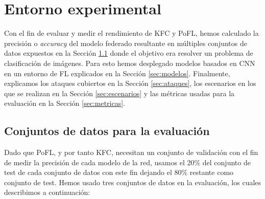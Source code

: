 \chapter{Entorno experimental}\label{sec:experimentos}

Con el fin de evaluar y medir el rendimiento de \ac{KFC} y \ac{PoFL}, hemos calculado la precisión o \textit{accuracy} del modelo federado resultante en múltiples conjuntos de datos expuestos en la Sección \ref{sec:evaldatasets} donde el objetivo era resolver un problema de clasificación de imágenes. Para esto hemos desplegado modelos basados en \ac{CNN} en un entorno de \ac{FL} explicados en la Sección \ref{sec:modelos}. Finalmente, explicamos los ataques cubiertos en la Sección \ref{sec:ataques}, los escenarios en los que se realizan en la Sección \ref{sec:escenarios} y las métricas usadas para la evaluación en la Sección \ref{sec:metricas}.

\section{Conjuntos de datos para la evaluación}\label{sec:evaldatasets}
Dado que \ac{PoFL}, y por tanto \ac{KFC}, necesitan un conjunto de validación con el fin de medir la precisión de cada modelo de la red, usamos el 20\% del conjunto de test de cada conjunto de datos con este fin dejando el 80\% restante como conjunto de test. Hemos usado tres conjuntos de datos en la evaluación, los cuales describimos a continuación:

